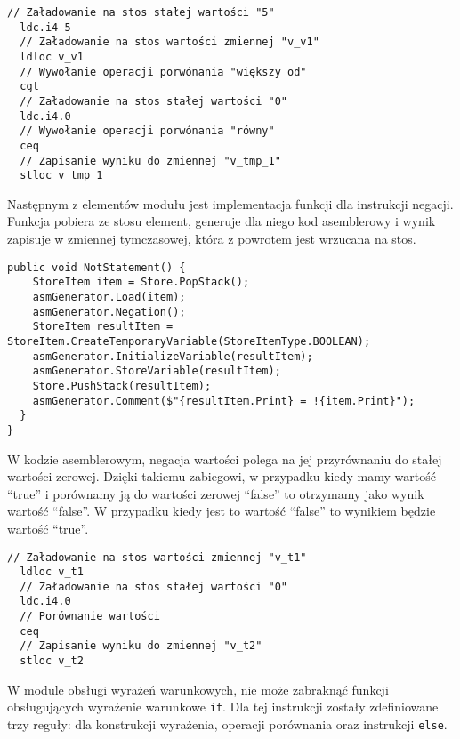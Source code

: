 \begin{lstlisting}[language=IL, caption={Kod assemblera przedstawiający porównanie ``mnieszy lub równy''}, label=alg:condition3]
  // Załadowanie na stos stałej wartości "5"
  ldc.i4 5
  // Załadowanie na stos wartości zmiennej "v_v1"
  ldloc v_v1
  // Wywołanie operacji porwónania "większy od"
  cgt
  // Załadowanie na stos stałej wartości "0"
  ldc.i4.0
  // Wywołanie operacji porwónania "równy"
  ceq
  // Zapisanie wyniku do zmiennej "v_tmp_1"
  stloc v_tmp_1
\end{lstlisting}

\par Następnym z elementów modułu jest implementacja funkcji dla instrukcji negacji. Funkcja pobiera ze stosu element, generuje dla niego kod asemblerowy i wynik zapisuje w zmiennej tymczasowej, która z powrotem jest wrzucana na stos.


\begin{lstlisting}[language=CSharp, caption={Implementacja funkcji obsługującej negację wartości}, label=alg:condition5]
  public void NotStatement() {
    StoreItem item = Store.PopStack();
    asmGenerator.Load(item);
    asmGenerator.Negation();
    StoreItem resultItem = StoreItem.CreateTemporaryVariable(StoreItemType.BOOLEAN);
    asmGenerator.InitializeVariable(resultItem);
    asmGenerator.StoreVariable(resultItem);
    Store.PushStack(resultItem);
    asmGenerator.Comment($"{resultItem.Print} = !{item.Print}");
  }
}
\end{lstlisting}

\par W kodzie asemblerowym, negacja wartości polega na jej przyrównaniu do stałej wartości zerowej. Dzięki takiemu zabiegowi, w przypadku kiedy mamy wartość ``true'' i porównamy ją do wartości zerowej ``false'' to otrzymamy jako wynik wartość ``false''. W przypadku kiedy jest to wartość ``false'' to wynikiem będzie wartość ``true''.

\begin{lstlisting}[language=IL, caption={Kod assemblera przedstawiający porównanie ``mnieszy lub równy''}, label=alg:condition6]
  // Załadowanie na stos wartości zmiennej "v_t1"
  ldloc v_t1
  // Załadowanie na stos stałej wartości "0"
  ldc.i4.0
  // Porównanie wartości
  ceq
  // Zapisanie wyniku do zmiennej "v_t2"
  stloc v_t2
\end{lstlisting}

\par W module obsługi wyrażeń warunkowych, nie może zabraknąć funkcji obsługujących wyrażenie warunkowe \texttt{if}. Dla tej instrukcji zostały zdefiniowane trzy reguły: dla konstrukcji wyrażenia, operacji porównania oraz instrukcji \texttt{else}.

